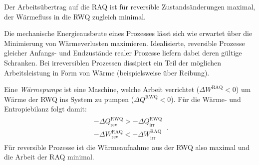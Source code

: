\begin{formal}
     Der Arbeitsübertrag auf die RAQ ist für reversible Zustandsänderungen maximal, der Wärmefluss in die RWQ zugleich minimal. 
\end{formal}
Die mechanische Energieausbeute eines Prozesses lässt sich wie erwartet über die Minimierung von Wärmeverlusten maximieren. Idealisierte, reversible Prozesse gleicher Anfangs- und Endzustände realer Prozesse liefern dabei deren gültige Schranken. Bei irreversiblen Prozessen dissipiert ein Teil der möglichen Arbeitsleistung in Form von Wärme (beispielsweise über Reibung).

Eine \emph{Wärmepumpe} ist eine Maschine, welche Arbeit verrichtet ($\Delta W^\mathrm{RAQ}<0$) um Wärme der RWQ ins System zu pumpen ($\Delta Q^\mathrm{RWQ}<0$).
Für die Wärme- und Entropiebilanz folgt damit:
\begin{align*}
    \boxed{
    \begin{aligned}
            -\Delta Q^\mathrm{RWQ}_\mathrm{rev}>-\Delta Q^\mathrm{RWQ}_\mathrm{irr}\\
            -\Delta W^\mathrm{RAQ}_\mathrm{rev}<-\Delta W^\mathrm{RAQ}_\mathrm{irr}
    \end{aligned}
    }\:.
\end{align*}
Für reversible Prozesse ist die Wärmeaufnahme aus der RWQ also maximal und die Arbeit der RAQ minimal.